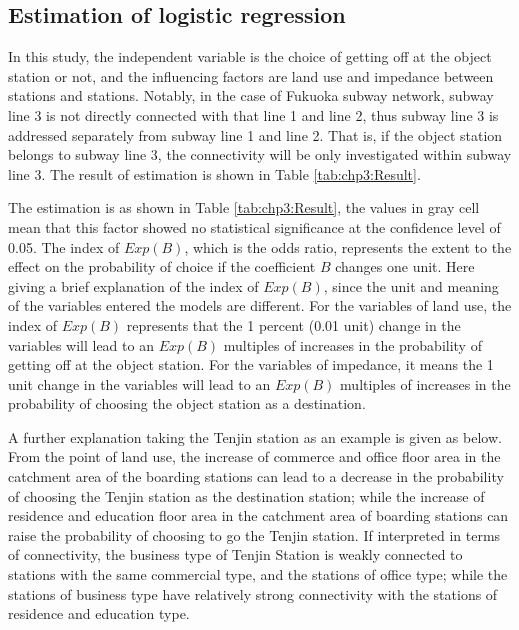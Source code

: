 \subsection{Estimation of logistic regression}
%
In this study, the independent variable is the choice of getting off at the object station or not, and the influencing factors are land use and impedance between stations and stations. Notably, in the case of Fukuoka subway network, subway line 3 is not directly connected with that line 1 and line 2, thus subway line 3 is addressed separately from subway line 1 and line 2. That is, if the object station belongs to subway line 3, the connectivity will be only investigated within subway line 3. The result of estimation is shown in Table \ref{tab:chp3:Result}.

%
The estimation is as shown in Table \ref{tab:chp3:Result}, the values in gray cell mean that this factor showed no statistical significance at the confidence level of 0.05. The index of $Exp(B)$, which is the odds ratio, represents the extent to the effect on the probability of choice if the coefficient $B$ changes one unit. Here giving a brief explanation of the index of $Exp(B)$, since the unit and meaning of the variables entered the models are different. For the variables of land use, the index of $Exp(B)$ represents that the 1 percent (0.01 unit) change in the variables will lead to an $Exp(B)$ multiples of increases in the probability of getting off at the object station. For the variables of impedance, it means the 1 unit change in the variables will lead to an $Exp(B)$ multiples of increases in the probability of choosing the object station as a destination. 

%
A further explanation taking the Tenjin station as an example is given as below. From the point of land use, the increase of commerce and office floor area in the catchment area of the boarding stations can lead to a decrease in the probability of choosing the Tenjin station as the destination station; while the increase of residence and education floor area in the catchment area of boarding stations can raise the probability of choosing to go the Tenjin station. If interpreted in terms of connectivity, the business type of Tenjin Station is weakly connected to stations with the same commercial type, and the stations of office type; while the stations of business type have relatively strong connectivity with the stations of residence and education type. 

%
